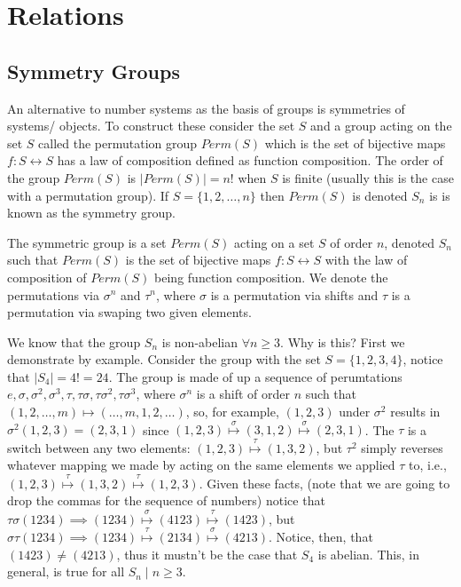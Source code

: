 \documentclass{report}
\begin{document}

\section{Relations}


\subsection{Symmetry Groups}

An alternative to number systems as the basis of groups is symmetries of systems/ objects. To construct these consider the set \( S \) and a group acting on the set \( S \) called the permutation group \( Perm(S) \) which is the set of bijective maps \( f: S \leftrightarrow S \) has a law of composition defined as function composition. The order of the group \( Perm(S) \) is \( |Perm(S)| =n! \) when \( S \) is finite (usually this is the case with a permutation group). If \( S = \{ 1,2,\ldots ,n \} \) then \( Perm(S) \) is denoted \( S_n \) is is known as the symmetry group.

\begin{definition}
  The symmetric group is a set \( Perm(S) \) acting on a set \( S \) of order \( n \), denoted \( S_n \) such that \( Perm(S) \) is the set of bijective maps \( f: S \leftrightarrow S \) with the law of composition of \( Perm(S) \) being function composition. We denote the permutations via \( \sigma^n  \) and \( \tau ^n \), where \( \sigma  \) is a permutation via shifts and \( \tau  \) is a permutation via swaping two given elements. 
\end{definition}


\begin{problem}[1.1.1]
  We know that the group \( S_n \) is non-abelian \( \forall n\ge 3 \). Why is this? First we demonstrate by example. Consider the group with the set \( S =\{1,2,3,4\}\), notice that \( |S_4| =4! =24 \). The group is made of up a sequence of perumtations \( e,\sigma ,\sigma^2,\sigma^3,\tau ,\tau \sigma ,\tau \sigma^2,\tau \sigma^3 \), where \( \sigma ^n \) is a shift of order \( n \) such that \( (1,2,\ldots,m )\mapsto (\ldots ,m,1,2,\ldots ) \), so, for example, \( (1,2,3)\) under \( \sigma^2 \) results in \(\sigma^2(1,2,3)=(2,3,1)\) since \( (1,2,3)\overset{\sigma}{\mapsto} (3,1,2) \overset{\sigma}{\mapsto} (2,3,1) \). The \( \tau  \) is a switch between any two elements: \( (1,2,3)\overset{\tau}{\mapsto}(1,3,2) \), but \( \tau ^2 \) simply reverses whatever mapping we made by acting on the same elements we applied \( \tau  \) to, i.e., \( (1,2,3)\overset{\tau}{\mapsto}(1,3,2)\overset{\tau }{\mapsto}(1,2,3) \). Given these facts, (note that we are going to drop the commas for the sequence of numbers) notice that \( \tau \sigma (1234) \implies (1234)\overset{\sigma}{\mapsto} (4123) \overset{\tau }{\mapsto} (1423)\), but \( \sigma \tau (1234)\implies (1234)\overset{\tau }{\mapsto} (2134) \overset{\sigma  }{\mapsto} (4213) \). Notice, then, that \( (1423)\neq (4213) \), thus it mustn't be the case that \( S_4 \) is abelian. This, in general, is true for all \( S_n \mid n\ge 3 \). 
\end{problem}
\end{document}
